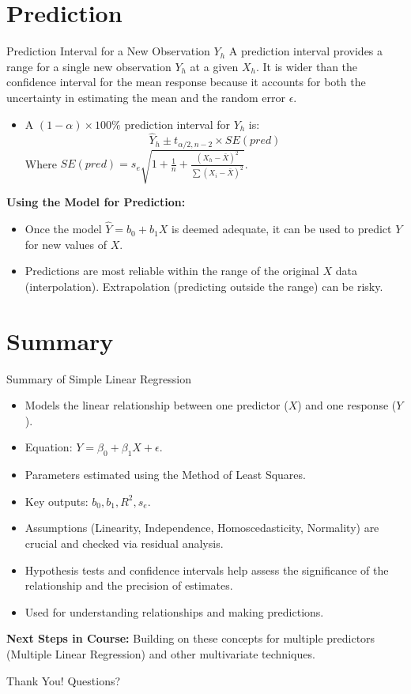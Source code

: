 \documentclass[aspectratio=169]{beamer}
\begin{document}
\section{Prediction}
\begin{frame}{Prediction Interval for a New Observation $Y_h$}
  A prediction interval provides a range for a single new observation $Y_h$ at a given $X_h$. It is wider than the confidence interval for the mean response because it accounts for both the uncertainty in estimating the mean and the random error $\epsilon$.
  \begin{itemize}
    \item A $(1-\alpha) \times 100\%$ prediction interval for $Y_h$ is:
    \begin{equation*}
      \hat{Y}_h \pm t_{\alpha/2, n-2} \times SE(pred)
    \end{equation*}
    Where $SE(pred) = s_e \sqrt{1 + \frac{1}{n} + \frac{(X_h - \bar{X})^2}{\sum (X_i - \bar{X})^2}}$.
  \end{itemize}
  \textbf{Using the Model for Prediction:}
  \begin{itemize}
    \item Once the model $\hat{Y} = b_0 + b_1 X$ is deemed adequate, it can be used to predict $Y$ for new values of $X$.
    \item Predictions are most reliable within the range of the original $X$ data (interpolation). Extrapolation (predicting outside the range) can be risky.
  \end{itemize}
\end{frame}

\section{Summary}
\begin{frame}{Summary of Simple Linear Regression}
  \begin{itemize}
    \item Models the linear relationship between one predictor ($X$) and one response ($Y$).
    \item Equation: $Y = \beta_0 + \beta_1 X + \epsilon$.
    \item Parameters estimated using the Method of Least Squares.
    \item Key outputs: $b_0, b_1, R^2, s_e$.
    \item Assumptions (Linearity, Independence, Homoscedasticity, Normality) are crucial and checked via residual analysis.
    \item Hypothesis tests and confidence intervals help assess the significance of the relationship and the precision of estimates.
    \item Used for understanding relationships and making predictions.
  \end{itemize}
  \textbf{Next Steps in Course:} Building on these concepts for multiple predictors (Multiple Linear Regression) and other multivariate techniques.
\end{frame}

\begin{frame}
  \centering
  \Huge Thank You!
  \vspace{1cm}
  \normalsize Questions?
\end{frame}
\end{document}
